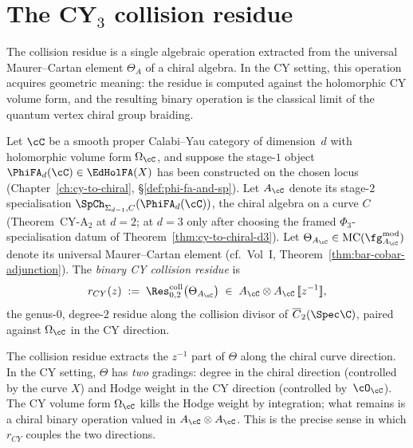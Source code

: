 \section{The CY\texorpdfstring{$_3$}{-3} collision residue}
\label{sec:cy3-collision-residue}

The collision residue is a single algebraic operation extracted from the
universal Maurer--Cartan element $\Theta_A$ of a chiral algebra. In the
CY setting, this operation acquires geometric meaning: the residue is
computed against the holomorphic CY volume form, and the resulting binary
operation is the classical limit of the quantum vertex chiral group
braiding.

\begin{definition}
\label{def:cy-collision-residue}
Let $\cC$ be a smooth proper Calabi--Yau category of dimension~$d$ with
holomorphic volume form $\Omega_\cC$, and suppose the stage-$1$ object
$\PhiFA_d(\cC) \in \EdHolFA(X)$ has been constructed on the chosen locus
(Chapter~\ref{ch:cy-to-chiral}, \S\ref{def:phi-fa-and-sp}). Let $A_\cC$
denote its stage-$2$ specialisation $\SpCh_{\Sigma_{d-1},C}(\PhiFA_d(\cC))$,
the chiral algebra on a curve $C$ (Theorem~CY-A$_2$ at $d = 2$;
at $d = 3$ only after choosing the framed $\Phi_3$-specialisation datum
of Theorem~\ref{thm:cy-to-chiral-d3}). Let
$\Theta_{A_\cC} \in \mathrm{MC}(\fg^{\mathrm{mod}}_{A_\cC})$
denote its universal Maurer--Cartan element (cf.\ Vol~I,
Theorem~\ref{thm:bar-cobar-adjunction}). The \emph{binary CY collision
residue} is
\[
 r_{CY}(z) \;:=\; \Res^{\mathrm{coll}}_{0,2}\bigl(\Theta_{A_\cC}\bigr)
 \;\in\; A_\cC \otimes A_\cC \,[\![z^{-1}]\!],
\]
the genus-$0$, degree-$2$ residue along the collision divisor of
$\overline{C}_2(\Spec\C)$, paired against $\Omega_\cC$ in the CY
direction.
\end{definition}

\begin{remark}
\label{rem:cy-direction-slot}
The collision residue extracts the $z^{-1}$ part of $\Theta$ along the
chiral curve direction. In the CY setting, $\Theta$ has \emph{two}
gradings: degree in the chiral direction (controlled by the curve $X$)
and Hodge weight in the CY direction (controlled by~$\cO_\cC$). The CY
volume form $\Omega_\cC$ kills the Hodge weight by integration; what
remains is a chiral binary operation valued in $A_\cC \otimes A_\cC$.
This is the precise sense in which $r_{CY}$ couples the two directions.
\end{remark}

